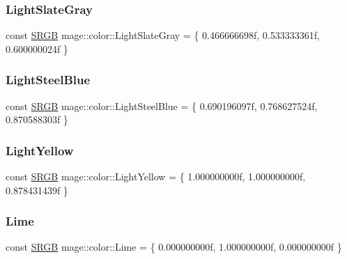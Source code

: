 \subsubsection{\texorpdfstring{Light\+Slate\+Gray}{LightSlateGray}}
{\footnotesize\ttfamily const \hyperlink{structmage_1_1_s_r_g_b}{S\+R\+GB} mage\+::color\+::\+Light\+Slate\+Gray = \{ 0.\+466666698f, 0.\+533333361f, 0.\+600000024f \}}

\hypertarget{namespacemage_1_1color_a83624532b875f86a965a0606e37c9c49}{}\label{namespacemage_1_1color_a83624532b875f86a965a0606e37c9c49} 
\subsubsection{\texorpdfstring{Light\+Steel\+Blue}{LightSteelBlue}}
{\footnotesize\ttfamily const \hyperlink{structmage_1_1_s_r_g_b}{S\+R\+GB} mage\+::color\+::\+Light\+Steel\+Blue = \{ 0.\+690196097f, 0.\+768627524f, 0.\+870588303f \}}

\hypertarget{namespacemage_1_1color_ad9ba3226f11cafb56cb192840ca950ce}{}\label{namespacemage_1_1color_ad9ba3226f11cafb56cb192840ca950ce} 
\subsubsection{\texorpdfstring{Light\+Yellow}{LightYellow}}
{\footnotesize\ttfamily const \hyperlink{structmage_1_1_s_r_g_b}{S\+R\+GB} mage\+::color\+::\+Light\+Yellow = \{ 1.\+000000000f, 1.\+000000000f, 0.\+878431439f \}}

\hypertarget{namespacemage_1_1color_a76b4ce58262d7b1391eb46d424be1828}{}\label{namespacemage_1_1color_a76b4ce58262d7b1391eb46d424be1828} 
\subsubsection{\texorpdfstring{Lime}{Lime}}
{\footnotesize\ttfamily const \hyperlink{structmage_1_1_s_r_g_b}{S\+R\+GB} mage\+::color\+::\+Lime = \{ 0.\+000000000f, 1.\+000000000f, 0.\+000000000f \}}

\hypertarget{namespacemage_1_1color_a7893ab9037dfc5ee563b46475ce636d1}{}\label{namespacemage_1_1color_a7893ab9037dfc5ee563b46475ce636d1} 
